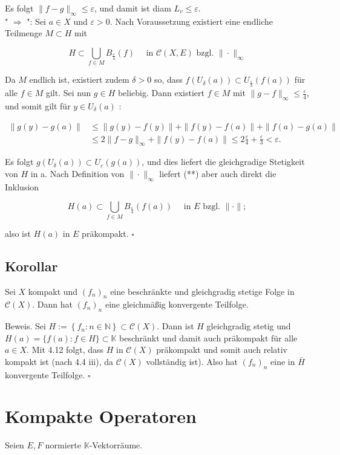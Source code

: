 \documentclass[10pt, letterpaper]{article}
\begin{document}
Es folgt $\|f-g\|_{\infty} \leq \varepsilon$, und damit ist diam $L_{v} \leq \varepsilon$.\\
" $\Longrightarrow$ ": Sei $a \in X$ und $\varepsilon>0$. Nach Voraussetzung existiert eine endliche Teilmenge $M \subset H$ mit

$$
H \subset \bigcup_{f \in M} B_{\frac{\varepsilon}{4}}(f) \quad \text { in } \mathcal{C}(X, E) \text { bzgl. }\|\cdot\|_{\infty}
$$

Da $M$ endlich ist, existiert zudem $\delta>0$ so, dass $f\left(U_{\delta}(a)\right) \subset U_{\frac{\varepsilon}{3}}(f(a))$ für alle $f \in M$ gilt. Sei nun $g \in H$ beliebig. Dann existiert $f \in M$ mit $\|g-f\|_{\infty} \leq \frac{\varepsilon}{4}$, und somit gilt für $y \in U_{\delta}(a)$ :

$$
\begin{aligned}
\|g(y)-g(a)\| & \leq\|g(y)-f(y)\|+\|f(y)-f(a)\|+\|f(a)-g(a)\| \\
& \leq 2\|f-g\|_{\infty}+\|f(y)-f(a)\| \leq 2 \frac{\varepsilon}{4}+\frac{\varepsilon}{3}<\varepsilon .
\end{aligned}
$$

Es folgt $g\left(U_{\delta}(a)\right) \subset U_{\varepsilon}(g(a))$, und dies liefert die gleichgradige Stetigkeit von $H$ in a. Nach Definition von $\|\cdot\|_{\infty}$ liefert (**) aber auch direkt die Inklusion

$$
H(a) \subset \bigcup_{f \in M} B_{\frac{\varepsilon}{4}}(f(a)) \quad \text { in } E \text { bzgl. }\|\cdot\| ;
$$

also ist $H(a)$ in $E$ präkompakt. \(\square\)

\subsection*{Korollar}
Sei $X$ kompakt und $\left(f_{n}\right)_{n}$ eine beschränkte und gleichgradig stetige Folge in $\mathcal{C}(X)$. Dann hat $\left(f_{n}\right)_{n}$ eine gleichmäßig konvergente Teilfolge.

Beweis. Sei $H:=\left\{f_{n}: n \in \mathbb{N}\right\} \subset \mathcal{C}(X)$. Dann ist $H$ gleichgradig stetig und $H(a)=\{f(a): f \in H\} \subset \mathbb{K}$ beschränkt und damit auch präkompakt für alle $a \in X$. Mit 4.12 folgt, dass $H$ in $\mathcal{C}(X)$ präkompakt und somit auch relativ kompakt ist (nach 4.4 iii), da $\mathcal{C}(X)$ vollständig ist). Also hat $\left(f_{n}\right)_{n}$ eine in $\bar{H}$ konvergente Teilfolge. \(\square\)

\section*{Kompakte Operatoren}
Seien $E, F$ normierte $\mathbb{K}$-Vektorräume.
\end{document}
